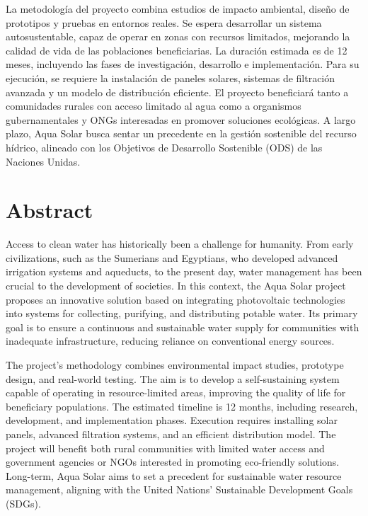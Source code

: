 \documentclass[12pt]{article}
\begin{document}
La metodología del proyecto combina estudios de impacto ambiental, diseño de prototipos y pruebas en entornos reales. Se espera desarrollar un sistema autosustentable, capaz de operar en zonas con recursos limitados, mejorando la calidad de vida de las poblaciones beneficiarias. La duración estimada es de 12 meses, incluyendo las fases de investigación, desarrollo e implementación. Para su ejecución, se requiere la instalación de paneles solares, sistemas de filtración avanzada y un modelo de distribución eficiente. El proyecto beneficiará tanto a comunidades rurales con acceso limitado al agua como a organismos gubernamentales y ONGs interesadas en promover soluciones ecológicas. A largo plazo, Aqua Solar busca sentar un precedente en la gestión sostenible del recurso hídrico, alineado con los Objetivos de Desarrollo Sostenible (ODS) de las Naciones Unidas.
\newpage
\section*{Abstract}
Access to clean water has historically been a challenge for humanity. From early civilizations, such as the Sumerians and Egyptians, who developed advanced irrigation systems and aqueducts, to the present day, water management has been crucial to the development of societies. In this context, the Aqua Solar project proposes an innovative solution based on integrating photovoltaic technologies into systems for collecting, purifying, and distributing potable water. Its primary goal is to ensure a continuous and sustainable water supply for communities with inadequate infrastructure, reducing reliance on conventional energy sources.

The project’s methodology combines environmental impact studies, prototype design, and real-world testing. The aim is to develop a self-sustaining system capable of operating in resource-limited areas, improving the quality of life for beneficiary populations. The estimated timeline is 12 months, including research, development, and implementation phases. Execution requires installing solar panels, advanced filtration systems, and an efficient distribution model. The project will benefit both rural communities with limited water access and government agencies or NGOs interested in promoting eco-friendly solutions. Long-term, Aqua Solar aims to set a precedent for sustainable water resource management, aligning with the United Nations’ Sustainable Development Goals (SDGs).
\newpage
\renewcommand{\contentsname}{Tabla de Contenido}
\tableofcontents
\end{document}
